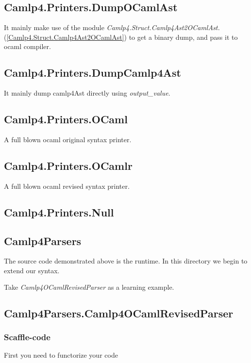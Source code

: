 \subsection{Camlp4.Printers.DumpOCamlAst}
\label{Camlp4.Printers.DumpOCamlAst}
It mainly make use of the module
\textit{Camlp4.Struct.Camlp4Ast2OCamlAst.}(\ref{Camlp4.Struct.Camlp4Ast2OCamlAst})
to get a binary dump, and pass it to ocaml compiler.

\subsection{Camlp4.Printers.DumpCamlp4Ast}
\label{Camlp4.Printers.DumpCamlp4Ast}
It mainly dump camlp4Ast directly using \textit{output\_value}.

\subsection{Camlp4.Printers.OCaml}
\label{Camlp4.Printers.OCaml}
A full blown ocaml original syntax printer.

\subsection{Camlp4.Printers.OCamlr}
\label{Camlp4.Printers.OCamlr}
A full blown ocaml revised syntax printer.

\subsection{Camlp4.Printers.Null}
\label{Camlp4.Printers.Null}

\subsection{Camlp4Parsers}
\label{Camlp4Parsers}

The source code demonstrated above is the runtime. In this directory
we begin to extend our syntax.

Take \textit{Camlp4OCamlRevisedParser} as a learning example.

\subsection{Camlp4Parsers.Camlp4OCamlRevisedParser}
\label{Camlp4Parsers.Camlp4OCamlRevisedParser}

\subsubsection{Scaffle-code}
First you need to functorize your code


